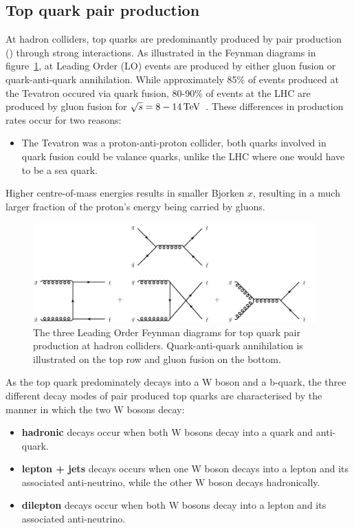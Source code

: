 \subsection{Top quark pair production}\label{subsec:ttbarTheory}
At hadron colliders, top quarks are predominantly produced by pair production (\ttbar) through strong interactions.
As illustrated in the Feynman diagrams in figure~\ref{fig:feyn_ttbar}, at Leading Order (LO) \ttbar events are produced by either gluon fusion or quark-anti-quark annihilation. 
While approximately 85\% of \ttbar events produced at the Tevatron occured via quark fusion, 80-90\% of \ttbar events at the LHC are produced by gluon fusion for $\sqrt{s} = 8-14\,\text{Te\hspace{-.08em}V}$~\cite{Tanabashi:2018oca,Deliot:2011np}.
These differences in production rates occur for two reasons:
\begin{itemize}
\item The Tevatron was a proton-anti-proton collider, both quarks involved in quark fusion could be valance quarks, unlike the LHC where one would have to be a sea quark. 
\end{itemize} Higher centre-of-mass energies results in smaller Bjorken $x$, resulting in a much larger fraction of the proton's energy being carried by gluons.	 

\begin{figure}[htbp]
\begin{center}
\includegraphics[width=0.97\textwidth]{figs/top-physics/ttbar_feyn.jpg}
\caption{The three Leading Order Feynman diagrams for top quark pair production at hadron colliders. Quark-anti-quark annihilation is illustrated on the top row and gluon fusion on the bottom.}
\label{fig:feyn_ttbar}
\end{center}
\end{figure}

As the top quark predominately decays into a W boson and a b-quark, the three different decay modes of pair produced top quarks are characterised by the manner in which the two W bosons decay:
\begin{itemize}
\item \textbf{hadronic} decays occur when both W bosons decay into a quark and anti-quark.
\item \textbf{lepton + jets} decays occurs when one W boson decays into a lepton and its associated anti-neutrino, while the other W boson decays hadronically.
\item \textbf{dilepton} decays occur when both W bosons decay into a lepton and its associated anti-neutrino.
\end{itemize}
 

